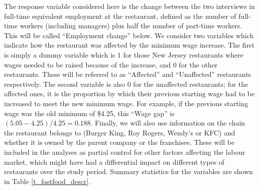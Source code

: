 The response variable considered here is the change between the two
interviews in full-time equivalent employment at the restaurant, defined
as the number of full-time workers (including managers) plus half the
number of part-time workers. This will be called ``Employment change''
below. We consider two variables which indicate how the restaurant was
affected by the minimum wage increase. The first is simply a dummy
variable which is 1 for those New Jersey restaurants where wages needed
to be raised because of the increase, and 0 for the other restaurants.
These will be referred to as ``Affected'' and ``Unaffected'' restaurants
respectively. The second variable is also 0 for the unaffected
restaurants; for the affected ones, it is the proportion by which their
previous starting wage had to be increased to meet the new minimum wage.
For example, if the previous starting wage was the old minimum of
\$4.25, this ``Wage gap'' is $(5.05-4.25)/4.25=0.188$. Finally, we will
also use information on the chain the restaurant belongs to (Burger
King, Roy Rogers, Wendy's or KFC) and whether it is owned by the parent
company or the franchisee. These will be included in the analyses as
partial control for other factors affecting the labour market, which
might have had a differential impact on different types of
restaurants over the study period. Summary statistics for the variables
are shown in Table \ref{t_fastfood_descr}.

